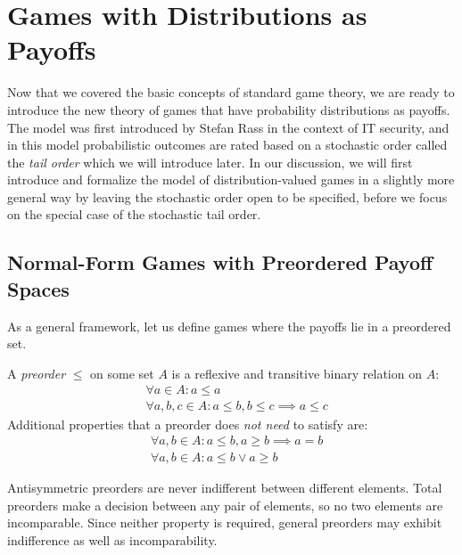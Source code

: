 \documentclass[a4paper]{scrreprt}
\begin{document}
    
    
    
    \chapter{Games with Distributions as Payoffs}
    Now that we covered the basic concepts of standard game theory, we are ready to introduce the new theory of games that have probability distributions as payoffs.
    The model was first introduced by Stefan Rass %
    in the context of IT security, and in this model probabilistic outcomes are rated based on a stochastic order called the \emph{tail order} which we will introduce later.
    In our discussion, we will first introduce and formalize the model of distribution-valued games in a slightly more general way by leaving the stochastic order open to be specified, before we focus on the special case of the stochastic tail order.
    
    \section{Normal-Form Games with Preordered Payoff Spaces}
    As a general framework, let us define games where the payoffs lie in a preordered set.
    \begin{defn}[Preorder]
        A \emph{preorder} $\leq$ on some set $A$ is a reflexive and transitive binary relation on $A$:
        \begin{align*}
            &\forall a \in A: a \leq a \tag{Reflexivity} \\
            &\forall a, b, c \in A: a \leq b, b \leq c \implies a \leq c \tag{Transitivity}
        \end{align*}
        Additional properties that a preorder does \emph{not need} to satisfy are:
        \begin{align*}
            &\forall a, b \in A: a \leq b, a \geq b \implies a = b \tag{Antisymmetry} \\
            &\forall a, b \in A: a \leq b \vee a \geq b \tag{Totality}
        \end{align*}
    \end{defn}
    Antisymmetric preorders are never indifferent between different elements. Total preorders make a decision between any pair of elements, so no two elements are incomparable. Since neither property is required, general preorders may exhibit indifference as well as incomparability.
    
\end{document}

